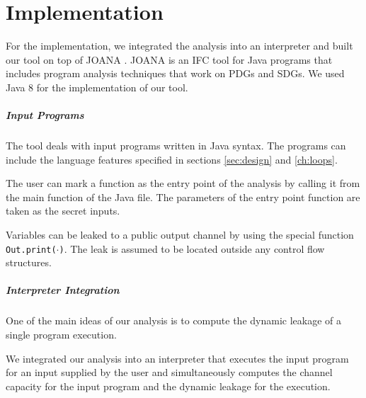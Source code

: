 \chapter{Implementation}\label{ch:impl}

For the implementation, we integrated the analysis into an interpreter and built our tool on top of JOANA \cite{joana}. JOANA is an IFC tool for Java programs that includes program analysis techniques that work on PDGs and SDGs. We used Java 8 for the implementation of our tool.

\paragraph{Input Programs}
The tool deals with input programs written in Java syntax. The programs can include the language features specified in sections \ref{sec:design} and \ref{ch:loops}.

The user can mark a function as the entry point of the analysis by calling it from the main function of the Java file. The parameters of the entry point function are taken as the secret inputs.

Variables can be leaked to a public output channel by using the special function \texttt{Out.print($\cdot$)}. The leak is assumed to be located outside any control flow structures.

\paragraph{Interpreter Integration}
One of the main ideas of our analysis is to compute the dynamic leakage of a single program execution.

We integrated our analysis into an interpreter that executes the input program for an input supplied by the user and simultaneously computes the channel capacity for the input program and the dynamic leakage for the execution.

